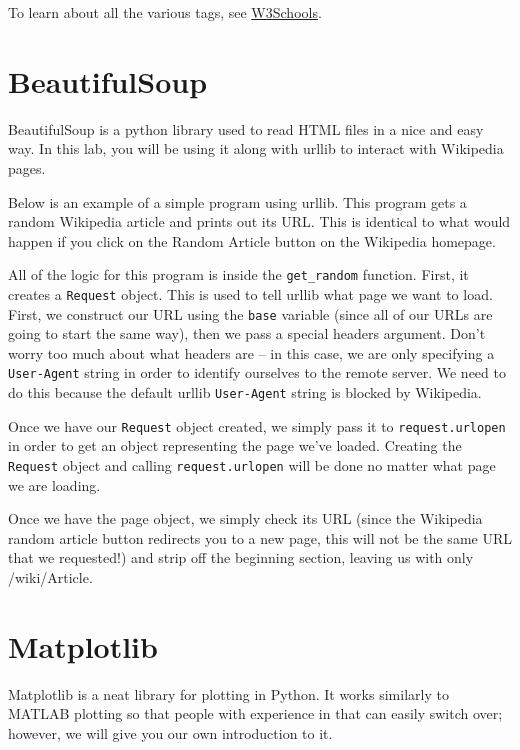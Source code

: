\documentclass[11pt]{cselabheader}
\begin{document}
To learn about all the various tags, see
\href{http://www.w3schools.com/}{W3Schools}.

\section{BeautifulSoup}

BeautifulSoup is a python library used to read HTML files in a nice
and easy way. In this lab, you will be using it along with urllib to
interact with Wikipedia pages.

Below is an example of a simple program using urllib. This
program gets a random Wikipedia article and prints out its URL. This
is identical to what would happen if you click on the Random Article button
on the Wikipedia homepage.



All of the logic for this program is inside the \lstinline{get_random}
function. First, it creates a \lstinline{Request} object. This is used
to tell urllib what page we want to load. First, we construct our URL using
the \lstinline{base} variable (since all of our URLs are going to start the
same way), then we pass a special headers argument. Don't worry too much about
what headers are -- in this case, we are only specifying a \lstinline{User-Agent}
string in order to identify ourselves to the remote server. We need to do this
because the default urllib \lstinline{User-Agent} string is blocked by
Wikipedia.

Once we have our \lstinline{Request} object created, we simply pass it to
\lstinline{request.urlopen} in order to get an object representing the page
we've loaded. Creating the \lstinline{Request} object and calling
\lstinline{request.urlopen} will be done no matter what page we are loading.

Once we have the page object, we simply check its URL (since the Wikipedia
random article button redirects you to a new page, this will not be the
same URL that we requested!) and strip off the beginning section, leaving
us with only /wiki/Article.

\pagebreak
\section{Matplotlib}

Matplotlib is a neat library for plotting in Python. It works similarly to
MATLAB plotting so that people with experience in that can easily switch over;
however, we will give you our own introduction to it.
\end{document}
